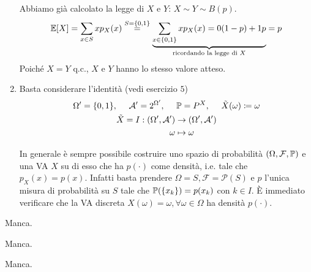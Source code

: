 \begin{enumerate}
Abbiamo già calcolato la legge di $X$ e $Y$: $X\sim Y\sim B(p)$.
\begin{equation*}
\mathbb{E}[X] =\sum\limits_{x\in S} xp_{X}(x)\overset{S=\{0,1\}}{=}\underbrace{\sum\limits_{x\in \{0,1\}} xp_{X}(x) =0(1-p) +1p}_{\text{ricordando la legge di } X} =p
\end{equation*}
Poiché $X=Y$ q.c., $X$ e $Y$ hanno lo stesso valore atteso.
\item Basta considerare l'identità (vedi esercizio $5$)
\begin{gather*}
\Omega '=\{0,1\} ,\ \ \ \ \mathcal{A} '=2^{\Omega '} ,\ \ \ \ \mathbb{P} =P^{X} ,\ \ \ \ \tilde{X}(\omega) \coloneqq \omega \\
\begin{aligned}
\tilde{X} =I:(\Omega ',\mathcal{A} ') & \rightarrow (\Omega ',\mathcal{A} ')\\
\omega  & \mapsto \omega 
\end{aligned}
\end{gather*}

\begin{oss}
In generale è sempre possibile costruire uno spazio di probabilità $(\Omega ,\mathcal{F} ,\mathbb{P})$ e una VA $X$ su di esso che ha $p(\cdotp)$ come densità, i.e. tale che $p_{X}(x) =p(x)$. Infatti basta prendere $\Omega =S,\mathcal{F} =\mathcal{P}(S)$ e $p$ l'unica misura di probabilità su $S$ tale che $\mathbb{P}(\{x_{k}\}) =p(x_{k})$ con $k\in I$. È immediato verificare che la VA discreta $X(\omega) =\omega ,\forall \omega \in \Omega $ ha densità $p(\cdotp)$.
\end{oss}
\end{enumerate}

\Soluzione

Manca.

\Soluzione

Manca.

\Soluzione

Manca.

\Soluzione

